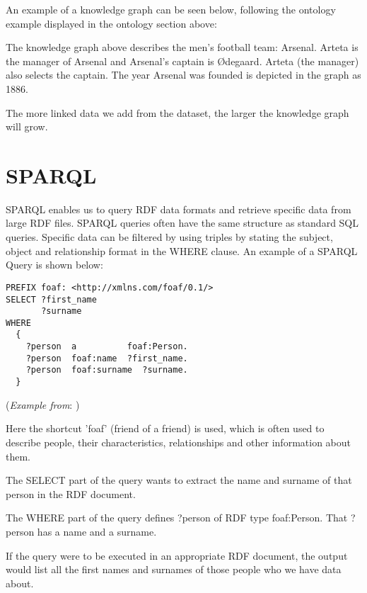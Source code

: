 \medskip
An example of a knowledge graph can be seen below, following the ontology example displayed in the ontology section above:

\bigskip
\begin{center}
\end{center}

The knowledge graph above describes the men's football team: Arsenal. Arteta is the manager of Arsenal and Arsenal's captain is Ødegaard. Arteta (the manager) also selects the captain. The year Arsenal was founded is depicted in the graph as 1886.

The more linked data we add from the dataset, the larger the knowledge graph will grow.

\section{SPARQL}

\hspace{0.5cm} SPARQL enables us to query RDF data formats and retrieve specific data from large RDF files. SPARQL queries often have the same structure as standard SQL queries. Specific data can be filtered by using triples by stating the subject, object and relationship format in the WHERE clause. \cite{sparlbook} An example of a SPARQL Query is shown below:

\begin{lstlisting}
PREFIX foaf: <http://xmlns.com/foaf/0.1/>
SELECT ?first_name 
       ?surname
WHERE
  {
    ?person  a          foaf:Person.
    ?person  foaf:name  ?first_name.
    ?person  foaf:surname  ?surname.
  }
\end{lstlisting}
(\textit{Example from}: \cite{foaf})

\medskip
Here the shortcut 'foaf' (friend of a friend) is used, which is often used to describe people, their characteristics, relationships and other information about them. \cite{foaf}

The SELECT part of the query wants to extract the name and surname of that person in the RDF document. 

The WHERE part of the query defines ?person of RDF type foaf:Person. That ?person has a name and a surname. 

If the query were to be executed in an appropriate RDF document, the output would list all the first names and surnames of those people who we have data about. 
